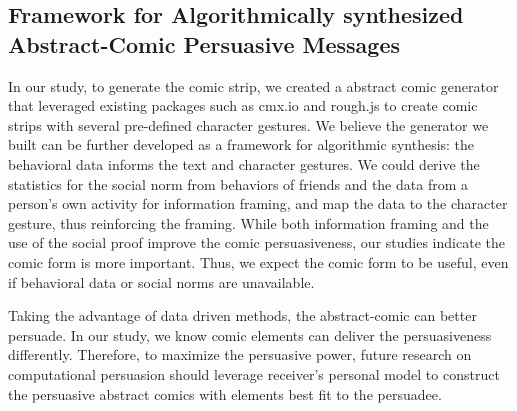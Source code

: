 \subsection{Framework for Algorithmically synthesized Abstract-Comic Persuasive Messages}

In our study, to generate the comic strip, we created a abstract comic generator that leveraged existing packages such as cmx.io and rough.js to create comic strips with several pre-defined character gestures. We believe the generator we built can be further developed as a framework for algorithmic synthesis: the behavioral data informs the text and character gestures. We could derive the statistics for the social norm from behaviors of friends and the data from a person's own activity for information framing, and map the data to the character gesture, thus reinforcing the framing. While both information framing and the use of the social proof improve the comic persuasiveness, our studies indicate the comic form is more important. Thus, we expect the comic form to be useful, even if behavioral data or social norms are unavailable.

Taking the advantage of data driven methods, the abstract-comic can better persuade. In our study, we know comic elements can deliver the persuasiveness differently. Therefore, to maximize the persuasive power, future research on computational persuasion should leverage receiver's personal model to construct the persuasive abstract comics with elements best fit to the persuadee.


